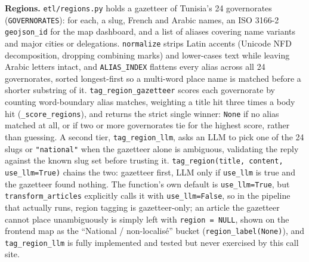 \textbf{Regions.} \texttt{etl/\allowbreak regions.py} holds a gazetteer of Tunisia's 24 governorates (\texttt{GOVERNORATES}): for each, a slug, French and Arabic names, an ISO 3166-2 \texttt{geojson\_id} for the map dashboard, and a list of aliases covering name variants and major cities or delegations. \texttt{normalize} strips Latin accents (Unicode NFD decomposition, dropping combining marks) and lower-cases text while leaving Arabic letters intact, and \texttt{ALIAS\_INDEX} flattens every alias across all 24 governorates, sorted longest-first so a multi-word place name is matched before a shorter substring of it. \texttt{tag\_region\_gazetteer} scores each governorate by counting word-boundary alias matches, weighting a title hit three times a body hit (\texttt{\_score\_regions}), and returns the strict single winner: \texttt{None} if no alias matched at all, or if two or more governorates tie for the highest score, rather than guessing. A second tier, \texttt{tag\_region\_llm}, asks an LLM to pick one of the 24 slugs or \texttt{"national"} when the gazetteer alone is ambiguous, validating the reply against the known slug set before trusting it. \texttt{tag\_region(title, content, use\_llm=True)} chains the two: gazetteer first, LLM only if \texttt{use\_llm} is true and the gazetteer found nothing. The function's own default is \texttt{use\_llm=True}, but \texttt{transform\_articles} explicitly calls it with \texttt{use\_llm=False}, so in the pipeline that actually runs, region tagging is gazetteer-only; an article the gazetteer cannot place unambiguously is simply left with \texttt{region = NULL}, shown on the frontend map as the ``National / non-localisé'' bucket (\texttt{region\_label(None)}), and \texttt{tag\_region\_llm} is fully implemented and tested but never exercised by this call site.

